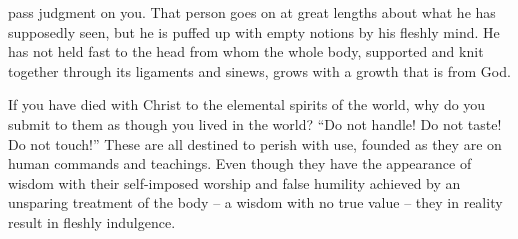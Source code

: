 {pass judgment on you. That person goes on at great lengths about what
he has supposedly
seen,
but he is puffed up
with empty notions
by
his
fleshly
mind.
He
has
not
held fast
to the head
from
whom
the whole
body,
supported
and
knit together
through
its ligaments
and
sinews,
grows
with a growth
that is from God.
\par }{\PP {}If
you have died
with
Christ
to
the elemental
spirits of the world,
why
do you submit
to them as though
you lived
in
the world?
“Do
not
handle! Do
not
taste! Do
not
touch!”
These are
all
destined to
perish
with use,
founded as they are on
human
commands
and
teachings.
Even though they have
the appearance of wisdom
with
their self-imposed worship
and
false humility
achieved by an unsparing treatment
of the body
– a wisdom with no
true value
– they in
reality result in
fleshly
indulgence.

}
